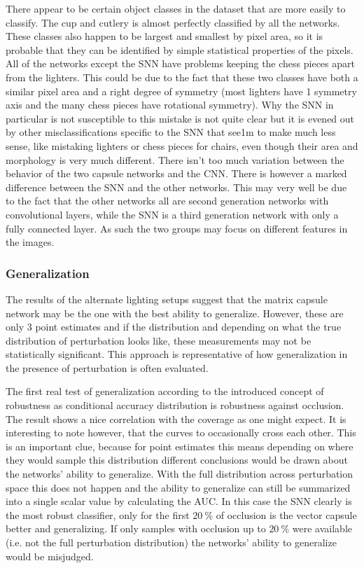 There appear to be certain object classes in the dataset that are more easily to classify. The cup and cutlery is almost perfectly classified by all the networks. These classes also happen to be largest and smallest by pixel area, so it is probable that they can be identified by simple statistical properties of the pixels. All of the networks except the SNN have problems keeping the chess pieces apart from the lighters. This could be due to the fact that these two classes have both a similar pixel area and a right degree of symmetry (most lighters have 1 symmetry axis and the many chess pieces have rotational symmetry). Why the SNN in particular is not susceptible to this mistake is not quite clear but it is evened out by other misclassifications specific to the SNN that see1m to make much less sense, like mistaking lighters or chess pieces for chairs, even though their area and morphology is very much different. There isn’t too much variation between the behavior of the two capsule networks and the CNN. There is however a marked difference between the SNN and the other networks. This may very well be due to the fact that the other networks all are second generation networks with convolutional layers, while the SNN is a third generation network with only a fully connected layer. As such the two groups may focus on different features in the images.\newpage
\vspace{.5cm}\subsubsection{Generalization}
The results of the alternate lighting setups suggest that the matrix capsule network may be the one with the best ability to generalize. However, these are only 3 point estimates and if the distribution and depending on what the true distribution of perturbation looks like, these measurements may not be statistically significant. This approach is representative of how generalization in the presence of perturbation is often evaluated.

The first real test of generalization according to the introduced concept of robustness as conditional accuracy distribution is robustness against occlusion. The result shows a nice correlation with the coverage as one might expect. It is interesting to note however, that the curves to occasionally cross each other. This is an important clue, because for point estimates this means depending on where they would sample this distribution different conclusions would be drawn about the networks’ ability to generalize. With the full distribution across perturbation space this does not happen and the ability to generalize can still be summarized into a single scalar value by calculating the AUC. In this case the SNN clearly is the most robust classifier, only for the first $\SI{20}{\percent}$ of occlusion is the vector capsule better and generalizing. If only samples with occlusion up to $\SI{20}{\percent}$ were available (i.e. not the full perturbation distribution) the networks’ ability to generalize would be misjudged.

